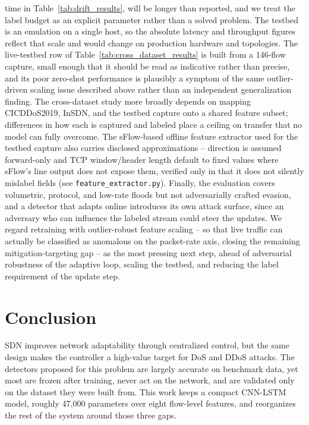 \documentclass[ASNA,twocolumn]{USG} %
\begin{document}
time in Table~\ref{tab:drift_results}, will be longer than reported, and we treat the label budget as an explicit parameter rather than a solved problem. The testbed is an emulation on a single host, so the absolute latency and throughput figures reflect that scale and would change on production hardware and topologies. The live-testbed row of Table~\ref{tab:cross_dataset_results} is built from a 146-flow capture, small enough that it should be read as indicative rather than precise, and its poor zero-shot performance is plausibly a symptom of the same outlier-driven scaling issue described above rather than an independent generalization finding. The cross-dataset study more broadly depends on mapping CICDDoS2019, InSDN, and the testbed capture onto a shared feature subset; differences in how each is captured and labeled place a ceiling on transfer that no model can fully overcome. The sFlow-based offline feature extractor used for the testbed capture also carries disclosed approximations -- direction is assumed forward-only and TCP window/header length default to fixed values where sFlow's line output does not expose them, verified only in that it does not silently mislabel fields (see \texttt{feature\_extractor.py}). Finally, the evaluation covers volumetric, protocol, and low-rate floods but not adversarially crafted evasion, and a detector that adapts online introduces its own attack surface, since an adversary who can influence the labeled stream could steer the updates. We regard retraining with outlier-robust feature scaling -- so that live traffic can actually be classified as anomalous on the packet-rate axis, closing the remaining mitigation-targeting gap -- as the most pressing next step, ahead of adversarial robustness of the adaptive loop, scaling the testbed, and reducing the label requirement of the update step.



\section{Conclusion}
\label{sec:conclusion}
SDN improves network adaptability through centralized control, but the same design makes the controller a high-value target for DoS and DDoS attacks. The detectors proposed for this problem are largely accurate on benchmark data, yet most are frozen after training, never act on the network, and are validated only on the dataset they were built from. This work keeps a compact CNN-LSTM model, roughly 47,000 parameters over eight flow-level features, and reorganizes the rest of the system around those three gaps.
\end{document}
